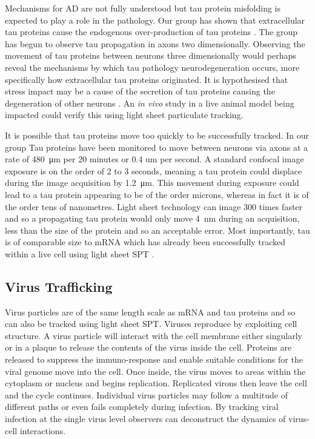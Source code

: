 Mechanisms for AD are not fully understood but tau protein misfolding is expected to play a role in the pathology\cite{LaFerla2008}. Our group has shown that extracellular tau proteins cause the endogenous over-production of tau proteins \cite{Michel2014a}. The group has begun to observe tau propagation in axons two dimensionally. Observing the movement of tau proteins between neurons three dimensionally would perhaps reveal the mechanisms by which tau pathology neurodegeneration occurs, more specifically how extracellular tau proteins originated. It is hypothesised that stress impact may be a cause of the secretion of tau proteins causing the degeneration of other neurons \cite{Gavett2011,Patterson2014a}. An \textit{in vivo} study in a live animal model being impacted could verify this using light sheet particulate tracking.

It is possible that tau proteins move too quickly to be successfully tracked. In our group Tau proteins have been monitored to move between neurons via axons at a rate of \SI{480}{\micro\meter} per 20 minutes or 0.4 um per second. A standard confocal image exposure is on the order of 2 to 3 seconds, meaning a tau protein could displace during the image acquisition by \SI{1.2}{\micro\meter}. This movement during exposure could lead to a tau protein appearing to be of the order microns, whereas in fact it is of the order tens of nanometres. Light sheet technology can image \SI{300}{} times faster and so a propagating tau protein would only move \SI{4}{\nano\meter} during an acquisition, less than the size of the protein and so an acceptable error. Most importantly, tau is of comparable size to mRNA which has already been successfully tracked within a live cell using light sheet SPT \cite{Spille2015a}.

\subsection{Virus Trafficking}

Virus particles are of the same length scale as mRNA and tau proteins and so can also be tracked using light sheet SPT. Viruses reproduce by exploiting cell structure. A virus particle will interact with the cell membrane either singularly or in a plaque to release the contents of the virus inside the cell. Proteins are released to suppress the immuno-response and enable suitable conditions for the viral genome move into the cell. Once inside, the virus moves to areas within the cytoplasm or nucleus and begins replication. Replicated virons then leave the cell and the cycle continues. Individual virus particles may follow a multitude of different paths or even fails completely during infection. By tracking viral infection at the single virus level observers can deconstruct the dynamics of virus-cell interactions.

